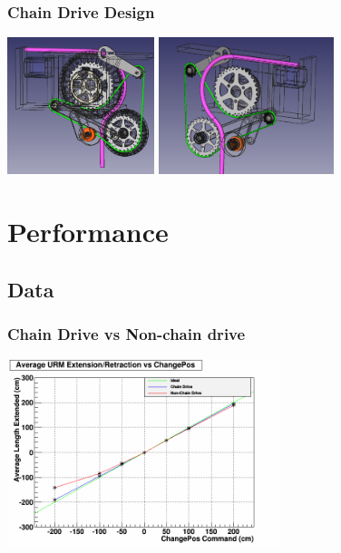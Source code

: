 \documentclass{beamer}
\begin{document}
\begin{frame}
\frametitle{Chain Drive Design}
\centering\includegraphics[height=4cm]{final3}
\centering\includegraphics[height=4cm]{final4}
\end{frame}

\section{Performance}
\subsection{Data}


\begin{frame}
\frametitle{Chain Drive vs Non-chain drive}
\centering\includegraphics[width=8cm]{Newumb1.png}
\end{frame}
\end{document}
